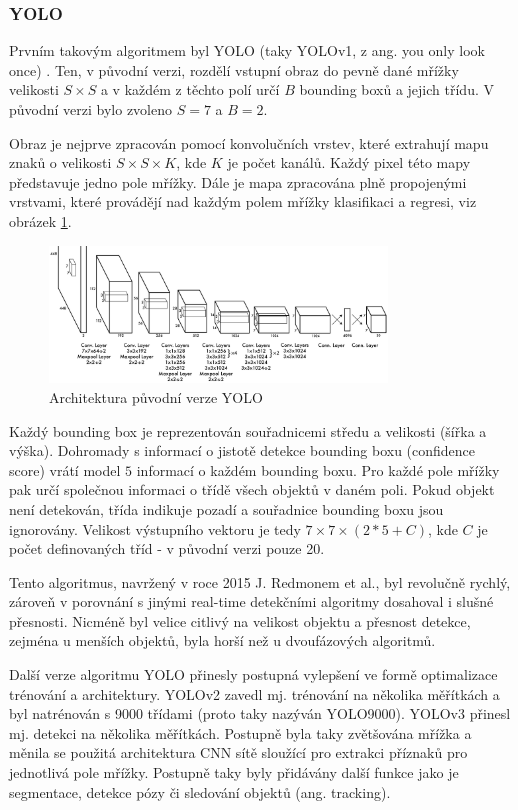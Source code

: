 \subsubsection{YOLO}
Prvním takovým algoritmem byl YOLO (taky YOLOv1, z ang. you only look once)
\cite{yolo}. Ten, v původní verzi, rozdělí vstupní obraz do pevně dané mřížky
velikosti $S \times S$ a v každém z těchto polí určí $B$ bounding boxů a jejich
třídu. V původní verzi bylo zvoleno $S = 7$ a $B = 2$.

Obraz je nejprve zpracován pomocí konvolučních vrstev, které extrahují mapu
znaků o velikosti $S \times S \times K$, kde $K$ je počet kanálů. Každý pixel
této mapy představuje jedno pole mřížky. Dále je mapa zpracována plně
propojenými vrstvami, které provádějí nad každým polem mřížky klasifikaci a
regresi, viz obrázek \ref{fig:yolo}.

\begin{figure}[]
    \centering
    \includegraphics[width=0.8\textwidth]{Figures/yolo}
    \caption{Architektura původní verze YOLO \cite{yolo}}
    \label{fig:yolo}
\end{figure}

Každý bounding box je reprezentován souřadnicemi středu a velikosti (šířka a
výška). Dohromady s informací o jistotě detekce bounding boxu (confidence
score) vrátí model $5$ informací o každém bounding boxu. Pro každé pole mřížky
pak určí společnou informaci o třídě všech objektů v daném poli. Pokud objekt
není detekován, třída indikuje pozadí a souřadnice bounding boxu jsou
ignorovány. Velikost výstupního vektoru je tedy $7 \times 7 \times (2 * 5 +
    C)$, kde $C$ je počet definovaných tříd - v původní verzi pouze 20.

Tento algoritmus, navržený v roce 2015 J. Redmonem et al., byl revolučně
rychlý, zároveň v porovnání s jinými real-time detekčními algoritmy dosahoval i
slušné přesnosti. Nicméně byl velice citlivý na velikost objektu a přesnost
detekce, zejména u menších objektů, byla horší než u dvoufázových algoritmů.

Další verze algoritmu YOLO přinesly postupná vylepšení ve formě optimalizace
trénování a architektury. YOLOv2 \cite{yolo9000} zavedl mj. trénování na
několika měřítkách a byl natrénován s 9000 třídami (proto taky nazýván
YOLO9000). YOLOv3 \cite{yolov3} přinesl mj. detekci na několika měřítkách.
Postupně byla taky zvětšována mřížka a měnila se použitá architektura CNN sítě
sloužící pro extrakci příznaků pro jednotlivá pole mřížky. Postupně taky byly
přidávány další funkce jako je segmentace, detekce pózy či sledování objektů
(ang. tracking).

